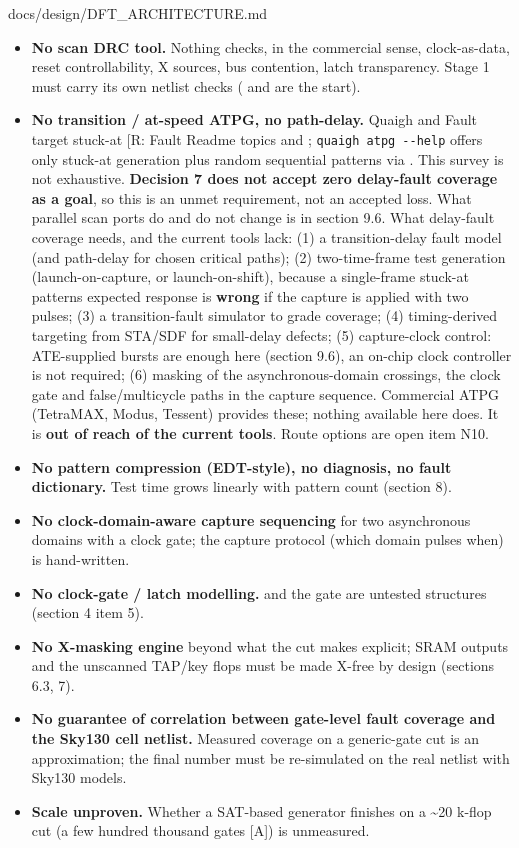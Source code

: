 \begin{relocated}{docs/design/DFT_ARCHITECTURE.md}
\begin{itemize}
\tightlist
\item
  \textbf{No scan DRC tool.} Nothing checks, in the commercial sense,
  clock-as-data, reset controllability, X sources, bus contention, latch
  transparency. Stage 1 must carry its own netlist checks
  ( and 
  are the start).
\item
  \textbf{No transition / at-speed ATPG, no path-delay.} Quaigh and
  Fault target stuck-at {[}R: Fault Readme topics and ;
  \texttt{quaigh\ atpg\ -\allowbreak{}-\allowbreak{}help} offers only
  stuck-at generation plus random sequential patterns via
  \code{--num-cycles}{]}. This survey is not exhaustive.
  \textbf{Decision 7 does not accept zero delay-fault coverage as a
  goal}, so this is an unmet requirement, not an accepted loss. What
  parallel scan ports do and do not change is in section 9.6. What
  delay-fault coverage needs, and the current tools lack: (1) a
  transition-delay fault model (and path-delay for chosen critical
  paths); (2) two-time-frame test generation (launch-on-capture, or
  launch-on-shift), because a single-frame stuck-at
  pattern\textquotesingle s expected response is \textbf{wrong} if the
  capture is applied with two pulses; (3) a transition-fault simulator
  to grade coverage; (4) timing-derived targeting from STA/SDF for
  small-delay defects; (5) capture-clock control: ATE-supplied bursts
  are enough here (section 9.6), an on-chip clock controller is not
  required; (6) masking of the asynchronous-domain crossings, the clock
  gate and false/\allowbreak{}multicycle paths in the capture sequence.
  Commercial ATPG (TetraMAX, Modus, Tessent) provides these; nothing
  available here does. It is \textbf{out of reach of the current tools}.
  Route options are open item N10.
\item
  \textbf{No pattern compression (EDT-style), no diagnosis, no fault
  dictionary.} Test time grows linearly with pattern count (section 8).
\item
  \textbf{No clock-domain-aware capture sequencing} for two asynchronous
  domains with a clock gate; the capture protocol (which domain pulses
  when) is hand-written.
\item
  \textbf{No clock-gate / latch modelling.}  and the gate
  are untested structures (section 4 item 5).
\item
  \textbf{No X-masking engine} beyond what the cut makes explicit; SRAM
  outputs and the unscanned TAP/key flops must be made X-free by design
  (sections 6.3, 7).
\item
  \textbf{No guarantee of correlation between gate-level fault coverage
  and the Sky130 cell netlist.} Measured coverage on a generic-gate cut
  is an approximation; the final number must be re-simulated on the real
  netlist with Sky130 models.
\item
  \textbf{Scale unproven.} Whether a SAT-based generator finishes on a
  \textasciitilde20 k-flop cut (a few hundred thousand gates {[}A{]}) is
  unmeasured.
\end{itemize}


\end{relocated}
